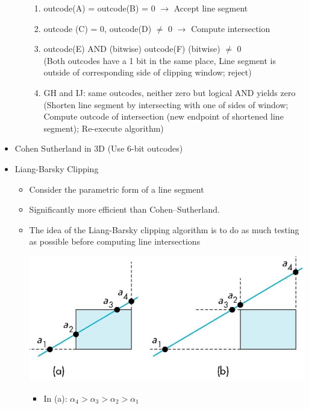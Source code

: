 \documentclass[11pt,a4paper]{article}
\begin{document}
\begin{itemize}
\begin{itemize}
\begin{center}
						\end{center}
						\begin{enumerate}
							\item outcode(A) = outcode(B) = 0 $\rightarrow$ Accept line segment
							\item outcode (C) = 0, outcode(D) $\ne$ 0 $\rightarrow$ Compute intersection
							\item outcode(E) AND (bitwise) outcode(F) (bitwise) $\ne$ 0\\
							(Both outcodes have a 1 bit in the same place, Line segment is outside of corresponding side of clipping window; reject)
							\item GH and IJ: same outcodes, neither zero but logical AND yields zero\\
							(Shorten line segment by intersecting with one of sides of window; Compute outcode of intersection (new endpoint of shortened line segment); Re-execute algorithm)
						\end{enumerate}
				\end{itemize}
			\item Cohen Sutherland in 3D (Use 6-bit outcodes)
			\item Liang-Barsky Clipping
				\begin{itemize}
					\item Consider the parametric form of a line segment
					\item Significantly more efficient than Cohen–Sutherland.
					\item The idea of the Liang-Barsky clipping algorithm is to do as much testing as possible before computing line intersections\\
					\begin{center}
						\includegraphics[scale=0.4]{pictures/LBClipping.jpg}
					\end{center}
						\begin{itemize}
							\item  In (a): $\alpha_4 > \alpha_3 > \alpha_2 > \alpha_1$\\

\end{itemize}
\end{itemize}
\end{itemize}
\end{document}
